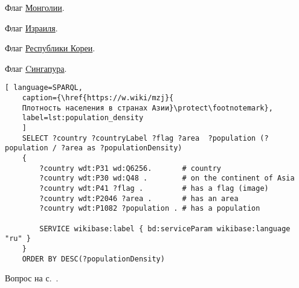 \begin{task}
\begin{marginfigure}[0.0cm]
	{
		\setlength{\fboxsep}{0pt}%
		\setlength{\fboxrule}{1pt}%
	}
	\caption{Флаг \href{https://w.wiki/mze}{Монголии}.}%
	\label{fig:flag_mongolia}%
\end{marginfigure}
\begin{marginfigure}[0.0cm]
	{
		\setlength{\fboxsep}{0pt}%
		\setlength{\fboxrule}{1pt}%
	}
	\caption{Флаг \href{https://w.wiki/mzh}{Израиля}.}%
	\label{fig:flag_israel}%
\end{marginfigure}
\begin{marginfigure}[0.0cm]
	{
		\setlength{\fboxsep}{0pt}%
		\setlength{\fboxrule}{1pt}%
	}
	\caption{Флаг \href{https://w.wiki/mzc}{Республики Кореи}.}%
	\label{fig:flag_kor}%
\end{marginfigure}
\begin{marginfigure}[0.0cm]
	{
		\setlength{\fboxsep}{0pt}%
		\setlength{\fboxrule}{1pt}%
	}
	\caption{Флаг \href{https://w.wiki/mzd}{Cингапура}.}%
	\label{fig:flag_singapore}%
\end{marginfigure}

	
	
	\begin{lstlisting}[ language=SPARQL, 
	caption={\href{https://w.wiki/mzj}{
	Плотность населения в странах Азии}\protect\footnotemark},
	label=lst:population_density
	]
	SELECT ?country ?countryLabel ?flag ?area  ?population (?population / ?area as ?populationDensity)
	{
		?country wdt:P31 wd:Q6256.       # country
		?country wdt:P30 wd:Q48 .        # on the continent of Asia
		?country wdt:P41 ?flag .         # has a flag (image)
		?country wdt:P2046 ?area .       # has an area
		?country wdt:P1082 ?population . # has a population
		
		SERVICE wikibase:label { bd:serviceParam wikibase:language "ru" }
	}
	ORDER BY DESC(?populationDensity)
	\end{lstlisting}
	
	\small{Вопрос на с.~\pageref{lst:without_inception}.}
\end{task}

